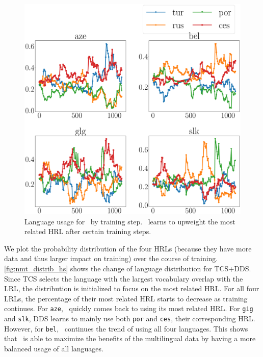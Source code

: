 \begin{figure}
    \centering
    \includegraphics[width=0.9\columnwidth]{figs/uniform_prob_plot.eps}
    \caption{\label{fig:nmt_distrib_uni}Language usage for \dds~by training step. \dds~learns to upweight the most related HRL after certain training steps.}
\end{figure}
We plot the probability distribution of the four HRLs (because they have more data and thus larger impact on training) over the course of training.  \autoref{fig:nmt_distrib_hs} shows the change of language distribution for TCS+DDS. Since TCS selects the language with the largest vocabulary overlap with the LRL, the distribution is initialized to focus on the most related HRL. For all four LRLs, the percentage of their most related HRL starts to decrease as training continues. For \texttt{aze}, \dds~quickly comes back to using its most related HRL. For \texttt{gig} and \texttt{slk}, DDS learns to mainly use both \texttt{por} and \texttt{ces}, their corresponding HRL. However, for \texttt{bel}, \dds~continues the trend of using all four languages. This shows that \dds~is able to maximize the benefits of the multilingual data by having a more balanced usage of all languages. 


